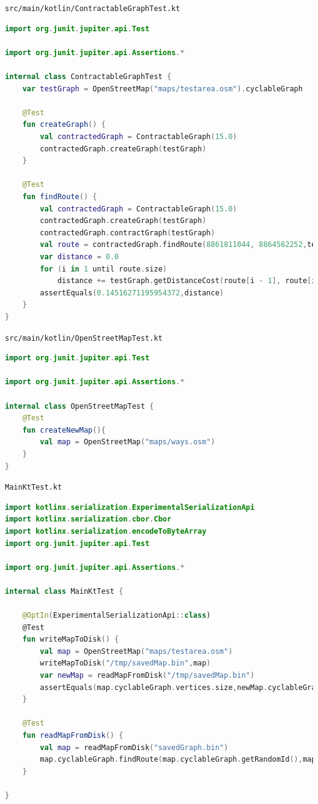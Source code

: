 \documentclass[11pt,twoside,a4paper]{report}
\begin{document}
\texttt{src/main/kotlin/ContractableGraphTest.kt}
\begin{lstlisting}[language=kotlin]
import org.junit.jupiter.api.Test

import org.junit.jupiter.api.Assertions.*

internal class ContractableGraphTest {
    var testGraph = OpenStreetMap("maps/testarea.osm").cyclableGraph

    @Test
    fun createGraph() {
        val contractedGraph = ContractableGraph(15.0)
        contractedGraph.createGraph(testGraph)
    }

    @Test
    fun findRoute() {
        val contractedGraph = ContractableGraph(15.0)
        contractedGraph.createGraph(testGraph)
        contractedGraph.contractGraph(testGraph)
        val route = contractedGraph.findRoute(8861811044, 8864562252,testGraph,false)
        var distance = 0.0
        for (i in 1 until route.size)
            distance += testGraph.getDistanceCost(route[i - 1], route[i])
        assertEquals(0.14516271195954372,distance)
    }
}
\end{lstlisting}
\texttt{src/main/kotlin/OpenStreetMapTest.kt}
\begin{lstlisting}[language=kotlin]
import org.junit.jupiter.api.Test

import org.junit.jupiter.api.Assertions.*

internal class OpenStreetMapTest {
    @Test
    fun createNewMap(){
        val map = OpenStreetMap("maps/ways.osm")
    }
}
\end{lstlisting}
\texttt{MainKtTest.kt}
\begin{lstlisting}[language=kotlin]
import kotlinx.serialization.ExperimentalSerializationApi
import kotlinx.serialization.cbor.Cbor
import kotlinx.serialization.encodeToByteArray
import org.junit.jupiter.api.Test

import org.junit.jupiter.api.Assertions.*

internal class MainKtTest {

    @OptIn(ExperimentalSerializationApi::class)
    @Test
    fun writeMapToDisk() {
        val map = OpenStreetMap("maps/testarea.osm")
        writeMapToDisk("/tmp/savedMap.bin",map)
        var newMap = readMapFromDisk("/tmp/savedMap.bin")
        assertEquals(map.cyclableGraph.vertices.size,newMap.cyclableGraph.vertices.size)
    }

    @Test
    fun readMapFromDisk() {
        val map = readMapFromDisk("savedGraph.bin")
        map.cyclableGraph.findRoute(map.cyclableGraph.getRandomId(),map.cyclableGraph.getRandomId(),10.0,2.0,false)
    }

}
\end{lstlisting}
\newpage
{}
\printbibliography
\label{end}
\end{document}

